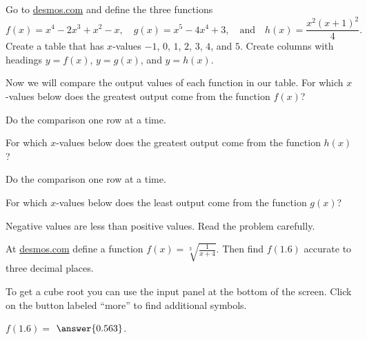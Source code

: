 \documentclass{ximera}
\begin{document}
\begin{question}
Go to \url{desmos.com} and define the three functions 
\[
f(x)=x^4-2x^3+x^2-x,\quad g(x)=x^5-4x^4+3,\quad\text{and}\quad h(x)=\frac{x^2(x+1)^2}{4}.
\]
Create a table that has $x$-values $-1$, $0$, $1$, $2$, $3$, $4$, and $5$. Create columns with headings $y=f(x)$, $y=g(x)$, and $y=h(x)$.

Now we will compare the output values of each function in our table. For which $x$-values below does the greatest output come from the function $f(x)$?
  \begin{solution}
    \begin{multiple-choice}
    \end{multiple-choice}
    \begin{hint}
    Do the comparison one row at a time.
    \end{hint}    
For which $x$-values below does the greatest output come from the function $h(x)$?
    \begin{multiple-choice}
    \end{multiple-choice}
    \begin{hint}
    Do the comparison one row at a time.
    \end{hint}
For which $x$-values below does the least output come from the function $g(x)$?
    \begin{multiple-choice}
    \end{multiple-choice}
    \begin{hint}
    Negative values are less than positive values. Read the problem carefully.
    \end{hint}
  \end{solution}
\end{question}

\begin{question}
At \url{desmos.com} define a function $f(x)=\sqrt[3]{\frac{1}{x+4}}$. Then find $f(1.6)$ accurate to three decimal places.
\begin{solution}
\begin{hint}
To get a cube root you can use the input panel at the bottom of the screen. Click on the button labeled ``more'' to find additional symbols. 
\end{hint}
$f(1.6)=$ $\answer{0.563}$.
\end{solution}
\end{question}
\end{document}
